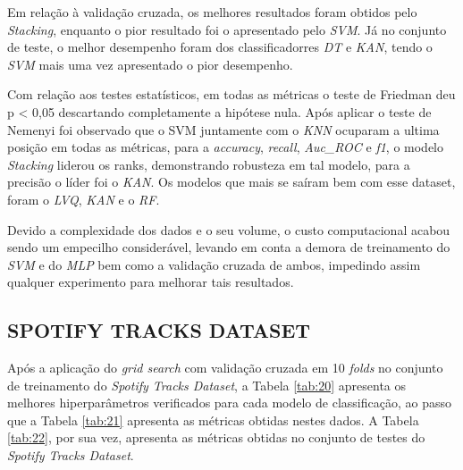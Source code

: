 \documentclass[journal]{IEEEtran}
\begin{document}
Em relação à validação cruzada, os melhores resultados foram obtidos pelo \textit{Stacking}, enquanto o pior resultado foi o apresentado pelo \textit{SVM}. Já no conjunto de teste, o melhor desempenho foram dos classificadorres \textit{DT} e \textit{KAN}, tendo o \textit{SVM} mais uma vez apresentado o pior desempenho.

Com relação aos testes estatísticos, em todas as métricas o teste de Friedman deu p < 0,05 descartando completamente a hipótese nula. Após aplicar o teste de Nemenyi foi observado que o SVM juntamente com o \textit{KNN} ocuparam a ultima posição em todas as métricas, para a \textit{accuracy}, \textit{recall}, \textit{Auc\_ROC} e \textit{f1}, o modelo \textit{Stacking} liderou os ranks, demonstrando robusteza em tal modelo, para a precisão o líder foi o \textit{KAN}. Os modelos que mais se saíram bem com esse dataset, foram o \textit{LVQ}, \textit{KAN} e o \textit{RF}.

Devido a complexidade dos dados e o seu volume, o custo computacional acabou sendo um empecilho considerável, levando em conta a demora de treinamento do \textit{SVM} e do \textit{MLP} bem como a validação cruzada de ambos, impedindo assim qualquer experimento para melhorar tais resultados.


\subsection{SPOTIFY TRACKS DATASET}

Após a aplicação do \textit{grid search} com validação cruzada em 10 \textit{folds} no conjunto de treinamento do \textit{Spotify Tracks Dataset}, a Tabela \ref{tab:20} apresenta os melhores hiperparâmetros verificados para cada modelo de classificação, ao passo que a Tabela \ref{tab:21} apresenta as métricas obtidas nestes dados. A Tabela \ref{tab:22}, por sua vez, apresenta as métricas obtidas no conjunto de testes do \textit{Spotify Tracks Dataset}.
\end{document}
